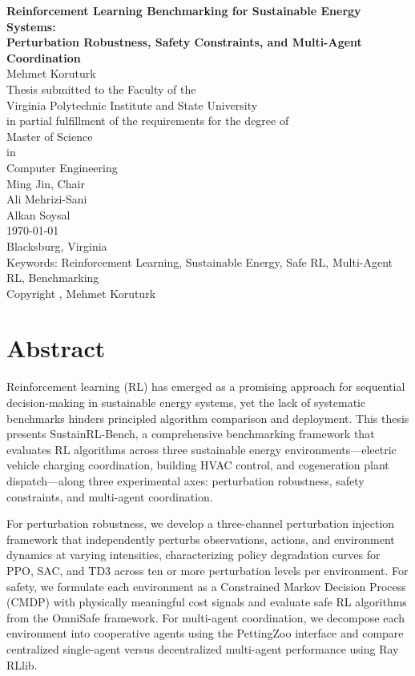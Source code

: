\documentclass[12pt, letterpaper]{report}
\begin{document}
\begin{titlepage}
\centering
\vspace*{1in}
{\Large\bfseries Reinforcement Learning Benchmarking for Sustainable Energy Systems:\\ Perturbation Robustness, Safety Constraints, and Multi-Agent Coordination}\\[2cm]
{\large Mehmet Koruturk}\\[1cm]
Thesis submitted to the Faculty of the\\
Virginia Polytechnic Institute and State University\\
in partial fulfillment of the requirements for the degree of\\[0.5cm]
{\large Master of Science}\\
in\\
{\large Computer Engineering}\\[1.5cm]
Ming Jin, Chair\\
Ali Mehrizi-Sani\\
Alkan Soysal\\[1.5cm]
\today\\
Blacksburg, Virginia\\[0.5cm]
Keywords: Reinforcement Learning, Sustainable Energy, Safe RL, Multi-Agent RL, Benchmarking\\[0.3cm]
Copyright \the\year, Mehmet Koruturk
\end{titlepage}

\chapter*{Abstract}

Reinforcement learning (RL) has emerged as a promising approach for sequential decision-making in sustainable energy systems, yet the lack of systematic benchmarks hinders principled algorithm comparison and deployment. This thesis presents SustainRL-Bench, a comprehensive benchmarking framework that evaluates RL algorithms across three sustainable energy environments---electric vehicle charging coordination, building HVAC control, and cogeneration plant dispatch---along three experimental axes: perturbation robustness, safety constraints, and multi-agent coordination.

For perturbation robustness, we develop a three-channel perturbation injection framework that independently perturbs observations, actions, and environment dynamics at varying intensities, characterizing policy degradation curves for PPO, SAC, and TD3 across ten or more perturbation levels per environment. For safety, we formulate each environment as a Constrained Markov Decision Process (CMDP) with physically meaningful cost signals and evaluate safe RL algorithms from the OmniSafe framework. For multi-agent coordination, we decompose each environment into cooperative agents using the PettingZoo interface and compare centralized single-agent versus decentralized multi-agent performance using Ray RLlib.
\end{document}
